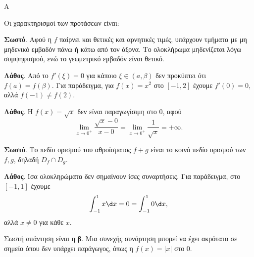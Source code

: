\begin{thema}{Α}
\begin{erwthma}
\item {}

\item {}

\item {}

\item Οι χαρακτηρισμοί των προτάσεων είναι:
\begin{alist}
\item \textbf{Σωστό}. Αφού η $f$ παίρνει και θετικές και αρνητικές τιμές, υπάρχουν τμήματα με μη μηδενικό εμβαδόν πάνω ή κάτω από τον άξονα. Το ολοκλήρωμα μηδενίζεται λόγω συμψηφισμού, ενώ το γεωμετρικό εμβαδόν είναι θετικό.
\item \textbf{Λάθος}. Από το $f'(\xi)=0$ για κάποιο $\xi\in(a,\beta)$ δεν προκύπτει ότι $f(a)=f(\beta)$. Για παράδειγμα, για $f(x)=x^2$ στο $[-1,2]$ έχουμε $f'(0)=0$, αλλά $f(-1)\neq f(2)$.
\item \textbf{Λάθος}. Η $f(x)=\sqrt{x}$ δεν είναι παραγωγίσιμη στο $0$, αφού
\[ \lim_{x\to0^+}\dfrac{\sqrt{x}-0}{x-0}=\lim_{x\to0^+}\dfrac{1}{\sqrt{x}}=+\infty. \]
\item \textbf{Σωστό}. Το πεδίο ορισμού του αθροίσματος $f+g$ είναι το κοινό πεδίο ορισμού των $f,g$, δηλαδή $D_f\cap D_g$.
\item \textbf{Λάθος}. Ίσα ολοκληρώματα δεν σημαίνουν ίσες συναρτήσεις. Για παράδειγμα, στο $[-1,1]$ έχουμε
\[ \dint_{-1}^{1}x\d x=0=\dint_{-1}^{1}0\d x, \]
αλλά $x\neq0$ για κάθε $x$.
\end{alist}

\item Σωστή απάντηση είναι η \textbf{β}. Μια συνεχής συνάρτηση μπορεί να έχει ακρότατο σε σημείο όπου δεν υπάρχει παράγωγος, όπως η $f(x)=|x|$ στο $0$.
\end{erwthma}
\end{thema}

